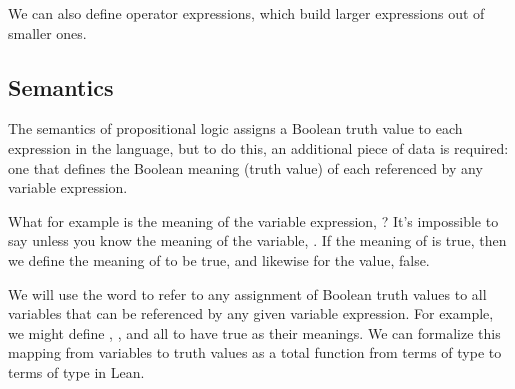 \documentclass[letterpaper,10pt,english]{sphinxmanual}
\begin{document}
\sphinxAtStartPar
We can also define operator expressions, which
build larger expressions out of smaller ones.

\begin{sphinxVerbatim}[commandchars=\\\{\}]
       
       
\end{sphinxVerbatim}


\subsection{Semantics}
\label{\detokenize{A_01_Propositional_Logic:id1}}
\sphinxAtStartPar
The semantics of propositional logic assigns a Boolean
truth value to each expression in the language, but to
do this, an additional piece of data is required: one
that defines the Boolean meaning (truth value) of each
 referenced by any variable expression.

\sphinxAtStartPar
What for example is the meaning of the variable expression,
? It’s impossible to say unless you know the meaning of
the variable, . If the meaning of  is true, then we
define the meaning of  to be true, and likewise for the
value, false.

\sphinxAtStartPar
We will use the word  to refer to any
assignment of Boolean truth values to all variables that
can be referenced by any given variable expression. For
example, we might define , , and  all to have
true as their meanings.  We can formalize this mapping
from variables to truth values as a total function from
terms of type  to terms of type  in Lean.

\begin{sphinxVerbatim}[commandchars=\\\{\}]
     
      
\end{sphinxVerbatim}
\end{document}
